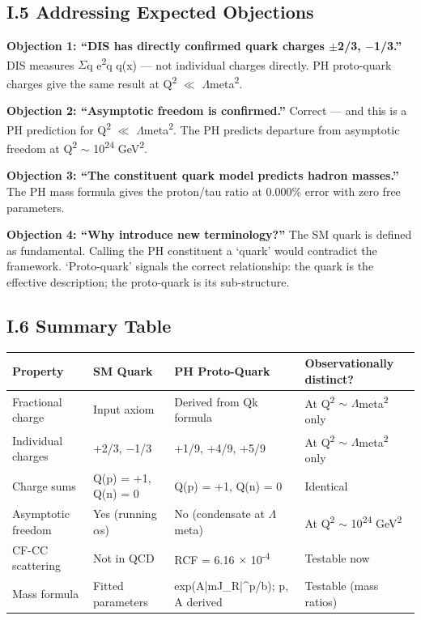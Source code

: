 \documentclass[11pt,letterpaper]{article}
\begin{document}
\subsection*{I.5  Addressing Expected Objections}

\noindent \textbf{Objection 1: ``DIS has directly confirmed quark charges $\pm$2/3, $-$1/3.'' }DIS measures $\Sigma$q e\textsuperscript{2}q q(x) --- not individual charges directly. PH proto-quark charges give the same result at Q\textsuperscript{2} $\ll$ $\Lambda$meta\textsuperscript{2}.

\noindent \textbf{Objection 2: ``Asymptotic freedom is confirmed.'' }Correct --- and this is a PH prediction for Q\textsuperscript{2} $\ll$ $\Lambda$meta\textsuperscript{2}. The PH predicts departure from asymptotic freedom at Q\textsuperscript{2} $\sim$ 10\textsuperscript{24} GeV\textsuperscript{2}.

\noindent \textbf{Objection 3: ``The constituent quark model predicts hadron masses.'' }The PH mass formula gives the proton/tau ratio at 0.000\% error with zero free parameters.

\noindent \textbf{Objection 4: ``Why introduce new terminology?'' }The SM quark is defined as fundamental. Calling the PH constituent a `quark' would contradict the framework. `Proto-quark' signals the correct relationship: the quark is the effective description; the proto-quark is its sub-structure.

\subsection*{I.6  Summary Table}

\begin{footnotesize}\begin{longtable}{|>{\raggedright\arraybackslash}p{}|>{\raggedright\arraybackslash}p{}|>{\raggedright\arraybackslash}p{}|>{\raggedright\arraybackslash}p{}|}
\hline
\textbf{Property} & \textbf{SM Quark} & \textbf{PH Proto-Quark} & \textbf{Observationally distinct?} \\ \hline
Fractional charge & Input axiom & Derived from Qk formula & At Q\textsuperscript{2} $\sim$ $\Lambda$meta\textsuperscript{2} only \\ \hline
Individual charges & +2/3, $-$1/3 & +1/9, +4/9, +5/9 & At Q\textsuperscript{2} $\sim$ $\Lambda$meta\textsuperscript{2} only \\ \hline
Charge sums & Q(p) = +1, Q(n) = 0 & Q(p) = +1, Q(n) = 0 & Identical \\ \hline
Asymptotic freedom & Yes (running $\alpha$s) & No (condensate at $\Lambda$meta) & At Q\textsuperscript{2} $\sim$ 10\textsuperscript{24} GeV\textsuperscript{2} \\ \hline
CF-CC scattering & Not in QCD & RCF = 6.16 $\times$ 10\textsuperscript{-4} & Testable now \\ \hline
Mass formula & Fitted parameters & exp(A|mJ\_R|\textasciicircum{}p/b); p, A derived & Testable (mass ratios) \\ \hline
\end{longtable}\end{footnotesize}
\end{document}
